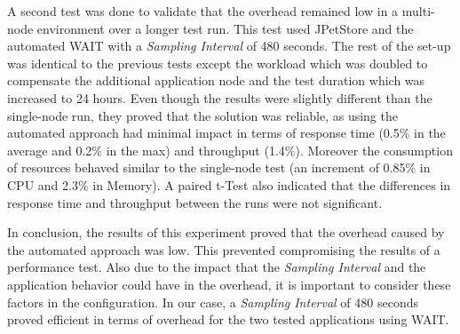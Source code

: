 \documentclass[runningheads,a4paper]{llncs}
\begin{document}

A second test was done to validate that the overhead remained low in a
multi-node environment over a longer test run. This test used JPetStore and the
automated WAIT with a \emph{Sampling Interval} of 480 seconds. The rest of the
set-up was identical to the previous tests except the workload which was doubled
to compensate the additional application node and the test duration which was
increased to 24 hours. Even though the results were slightly different than the
single-node run, they proved that the solution was reliable, as using the
automated approach had minimal impact in terms of response time (0.5\% in the
average and 0.2\% in the max) and throughput (1.4\%). Moreover the consumption
of resources behaved similar to the single-node test (an increment of 0.85\% in
CPU and 2.3\% in Memory). A paired t-Test also indicated
that the differences in response time and throughput between the runs were
not significant.


In conclusion, the results of this experiment proved that the
overhead caused by the automated approach was low. This prevented compromising
the results of a performance test. Also due to the impact that
the \emph{Sampling Interval} and the application behavior could have in the
overhead, it is important to consider these factors in the configuration. In our
case, a \emph{Sampling Interval} of 480 seconds proved efficient in terms of
overhead for the two tested applications using WAIT.
\end{document}
